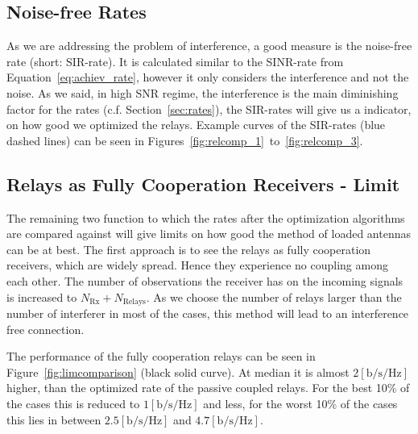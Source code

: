 \subsection{Noise-free Rates}
\label{sec:sir}
As we are addressing the problem of interference, a good measure is the noise-free rate (short: SIR-rate).
It is calculated similar to the SINR-rate from Equation~\eqref{eq:achiev_rate}, however it only considers the interference and not the noise.
As we said, in high SNR regime, the interference is the main diminishing factor for the rates (c.f. Section~\ref{sec:rates}), the SIR-rates will give us a indicator, on how good we optimized the relays.
Example curves of the SIR-rates (blue dashed lines) can be seen in Figures~\ref{fig:relcomp_1}~to~\ref{fig:relcomp_3}.

\subsection{Relays as Fully Cooperation Receivers - Limit}
\label{sec:fullrx_limit}
The remaining two function to which the rates after the optimization algorithms are compared against will give limits on how good the method of loaded antennas can be at best.
The first approach is to see the relays as fully cooperation receivers, which are widely spread.
Hence they experience no coupling among each other.
The number of observations the receiver has on the incoming signals is increased to $N_\text{Rx} + N_\text{Relays}$.
As we choose the number of relays larger than the number of interferer in most of the cases, this method will lead to an interference free connection.

The performance of the fully cooperation relays can be seen in Figure~\ref{fig:limcomparison} (black solid curve).
At median it is almost $2 \left[\text{b/s/Hz}\right]$ higher, than the optimized rate of the passive coupled relays.
For the best 10\% of the cases this is reduced to $1 \left[\text{b/s/Hz}\right]$ and less,
for the worst 10\% of the cases this lies in between  $2.5 \left[\text{b/s/Hz}\right]$ and $4.7 \left[\text{b/s/Hz}\right]$.


